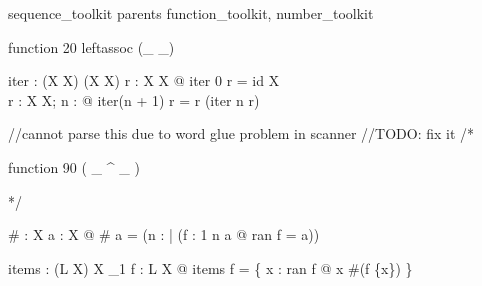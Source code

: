 \zsection sequence\_toolkit parents function\_toolkit, number\_toolkit\\

\begin{zed}
  function 20 leftassoc (\_ \upto \_)
\end{zed}


\begin{gendef}[X]
  iter : \nat \fun (X \rel X) \fun (X \rel X)
\where
  \forall r : X \rel X @ iter 0 r = id X\\
  \forall r : X \rel X; n : \nat @ iter(n + 1) r = r \comp (iter n r)
\end{gendef}

//cannot parse this due to word glue problem in scanner
//TODO: fix it
/*
\begin{zed}
  function 90 ( \_ ^{ \_ } )
\end{zed}

*/

\begin{gendef}[X]
  \# : \finset X \fun \nat
\where
  \forall a : \finset X @ \# a = 
     (\mu n : \nat | (\exists f : 1 \upto n \mapsto a @ ran f = a))
\end{gendef}



\begin{gendef}[L,X]
  items : (L \ffun X) \fun X \pfun \nat_1
\where
  \forall f : L \ffun X @
     items f = \{ x : ran f @ x \mapsto \#(f \rres \{x\}) \}
\end{gendef}

